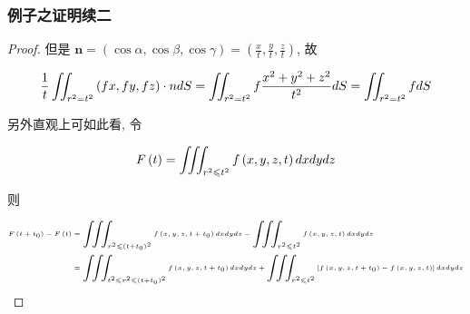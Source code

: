 \documentclass[aspectratio=2516]{beamer}
\begin{document}
\begin{frame}
\frametitle{\kaishu 例子之证明续二}

\kaishu

\begin{proof}
	
	\kaishu
	
	\small 
	
	但是 $\boldsymbol{n} = \left( {\cos \alpha ,\cos \beta ,\cos \gamma } \right) = \left( {\frac{x}{t},\frac{y}{t},\frac{z}{t}} \right)$, 故
	
	\vspace{-0.25cm}
	
	\begin{equation}
	\tiny 
	\frac{1}{t}\iint_{{r^2} = {t^2}} {\left( {fx,fy,fz} \right) \cdot ndS} = \iint_{{r^2} = {t^2}} {f\frac{{{x^2} + {y^2} + {z^2}}}{{{t^2}}}dS} = \iint_{{r^2} = {t^2}} {fdS}
	\notag
	\end{equation}
	
	\vspace{-0.15cm}
	
	另外直观上可如此看, 令
	
	\vspace{-0.15cm}
	
	\begin{equation}
	\tiny 
	F\left( t \right) = \iiint_{{r^2} \leqslant {t^2}} {f\left( {x,y,z,t} \right)dxdydz}
	\notag
	\end{equation}
	
	\vspace{-0.25cm}
	
	则
	
	\vspace{-0.5cm}
	
	\begin{equation}
	\tiny 
	\begin{split}
	F\left( {t + {t_0}} \right) - F\left( t \right) & = \iiint_{{r^2} \leqslant {{\left( {t + {t_0}} \right)}^2}} {f\left( {x,y,z,t + {t_0}} \right)dxdydz} - \iiint_{{r^2} \leqslant {t^2}} {f\left( {x,y,z,t} \right)dxdydz}\\
	& = \iiint_{{t^2} \leqslant {r^2} \leqslant {{\left( {t + {t_0}} \right)}^2}} {f\left( {x,y,z,t + {t_0}} \right)dxdydz} + \iiint_{{r^2} \leqslant {t^2}} {\left[ {f\left( {x,y,z,t + {t_0}} \right) - f\left( {x,y,z,t} \right)} \right]dxdydz}
	\end{split}
	\notag 
	\end{equation}
	
\end{proof}

\end{frame}
\end{document}
